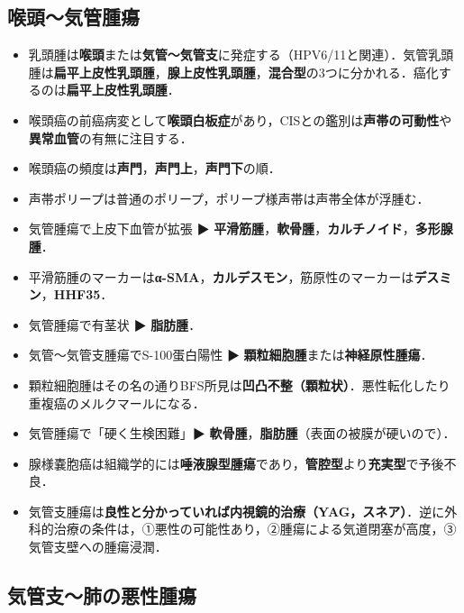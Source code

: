 \subsection{喉頭〜気管腫瘍}
\begin{itemize}

\item 乳頭腫は\textbf{喉頭}または\textbf{気管〜気管支}に発症する（HPV6/11と関連）．気管乳頭腫は\textbf{扁平上皮性乳頭腫}，\textbf{腺上皮性乳頭腫}，\textbf{混合型}の3つに分かれる．癌化するのは\textbf{扁平上皮性乳頭腫}．


\item 喉頭癌の前癌病変として\textbf{喉頭白板症}があり，CISとの鑑別は\textbf{声帯の可動性}や\textbf{異常血管}の有無に注目する．
\item 喉頭癌の頻度は\textbf{声門}，\textbf{声門上}，\textbf{声門下}の順．
\item 声帯ポリープは普通のポリープ，ポリープ様声帯は声帯全体が浮腫む．

\item 気管腫瘍で上皮下血管が拡張 ▶ \textbf{平滑筋腫}，\textbf{軟骨腫}，\textbf{カルチノイド}，\textbf{多形腺腫}．
\item 平滑筋腫のマーカーは\textbf{α-SMA}，\textbf{カルデスモン}，筋原性のマーカーは\textbf{デスミン}，\textbf{HHF35}．
\item 気管腫瘍で有茎状 ▶ \textbf{脂肪腫}．
\item 気管〜気管支腫瘍でS-100蛋白陽性 ▶ \textbf{顆粒細胞腫}または\textbf{神経原性腫瘍}．
\item 顆粒細胞腫はその名の通りBFS所見は\textbf{凹凸不整（顆粒状）}．悪性転化したり重複癌のメルクマールになる．
\item 気管腫瘍で「硬く生検困難」▶ \textbf{軟骨腫}，\textbf{脂肪腫}（表面の被膜が硬いので）．

\item 腺様嚢胞癌は組織学的には\textbf{唾液腺型腫瘍}であり，\textbf{管腔型}より\textbf{充実型}で予後不良．

\item 気管支腫瘍は\textbf{良性と分かっていれば内視鏡的治療（YAG，スネア）}．逆に外科的治療の条件は，①悪性の可能性あり，②腫瘍による気道閉塞が高度，③気管支壁への腫瘍浸潤．
\end{itemize}
\subsection{気管支〜肺の悪性腫瘍}

